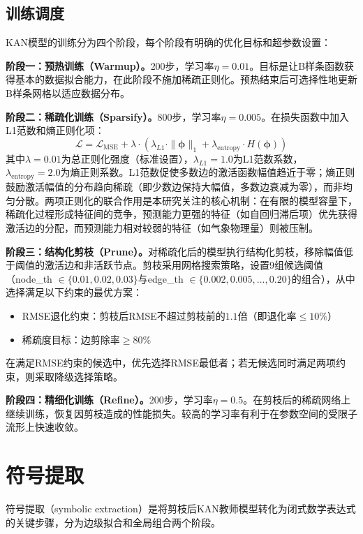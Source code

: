 \subsection{训练调度}

KAN模型的训练分为四个阶段，每个阶段有明确的优化目标和超参数设置：

\textbf{阶段一：预热训练（Warmup）。}200步，学习率$\eta = 0.01$。目标是让B样条函数获得基本的数据拟合能力，在此阶段不施加稀疏正则化。预热结束后可选择性地更新B样条网格以适应数据分布。

\textbf{阶段二：稀疏化训练（Sparsify）。}800步，学习率$\eta = 0.005$。在损失函数中加入L1范数和熵正则化项：
\begin{equation}
\mathcal{L} = \mathcal{L}_{\text{MSE}} + \lambda \cdot \left(\lambda_{L1} \cdot \|\boldsymbol{\phi}\|_1 + \lambda_{\text{entropy}} \cdot H(\boldsymbol{\phi})\right)
\end{equation}
其中$\lambda = 0.01$为总正则化强度（标准设置），$\lambda_{L1} = 1.0$为L1范数系数，$\lambda_{\text{entropy}} = 2.0$为熵正则系数。L1范数促使多数边的激活函数幅值趋近于零；熵正则鼓励激活幅值的分布趋向稀疏（即少数边保持大幅值，多数边衰减为零），而非均匀分散。两项正则化的联合作用是本研究关注的核心机制：在有限的模型容量下，稀疏化过程形成特征间的竞争，预测能力更强的特征（如自回归滞后项）优先获得激活边的分配，而预测能力相对较弱的特征（如气象物理量）则被压制。

\textbf{阶段三：结构化剪枝（Prune）。}对稀疏化后的模型执行结构化剪枝，移除幅值低于阈值的激活边和非活跃节点。剪枝采用网格搜索策略，设置9组候选阈值（node\_th $\in \{0.01, 0.02, 0.03\}$与edge\_th $\in \{0.002, 0.005, \ldots, 0.20\}$的组合），从中选择满足以下约束的最优方案：
\begin{itemize}
  \item RMSE退化约束：剪枝后RMSE不超过剪枝前的$1.1$倍（即退化率$\leq 10\%$）
  \item 稀疏度目标：边剪除率$\geq 80\%$
\end{itemize}
在满足RMSE约束的候选中，优先选择RMSE最低者；若无候选同时满足两项约束，则采取降级选择策略。

\textbf{阶段四：精细化训练（Refine）。}200步，学习率$\eta = 0.5$。在剪枝后的稀疏网络上继续训练，恢复因剪枝造成的性能损失。较高的学习率有利于在参数空间的受限子流形上快速收敛。

\section{符号提取}

符号提取（symbolic extraction）是将剪枝后KAN教师模型转化为闭式数学表达式的关键步骤，分为边级拟合和全局组合两个阶段。

